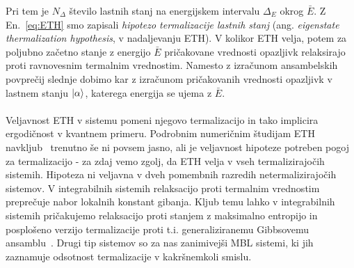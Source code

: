 Pri tem je $N_\Delta$ število lastnih stanj na energijskem intervalu $\Delta_E$ okrog $\bar{E}.$ Z En.~\eqref{eq:ETH} smo zapisali \emph{hipotezo termalizacije lastnih stanj} (ang. \emph{eigenstate thermalization hypothesis}, v nadaljevanju ETH). V kolikor ETH velja, potem za poljubno začetno stanje z energijo $\bar{E}$ pričakovane vrednosti opazljivk relaksirajo proti ravnovesnim termalnim vrednostim. Namesto z izračunom ansambelskih povprečij slednje dobimo kar z izračunom pričakovanih vrednosti opazljivk v lastnem stanju $\vert\alpha\rangle$, katerega energija se ujema z $\bar{E}.$\\\\
Veljavnost ETH v sistemu pomeni njegovo termalizacijo in tako implicira ergodičnost v kvantnem primeru. Podrobnim numeričnim študijam ETH navkljub~\cite{d2016quantum} trenutno še ni povsem jasno, ali je veljavnost hipoteze potreben pogoj za termalizacijo - za zdaj vemo zgolj, da ETH velja v vseh termalizirajočih sistemih. Hipoteza ni veljavna v dveh pomembnih razredih netermalizirajočih sistemov. V integrabilnih sistemih relaksacijo proti termalnim vrednostim preprečuje nabor lokalnih konstant  gibanja. Kljub temu lahko v integrabilnih sistemih pričakujemo relaksacijo proti stanjem z maksimalno entropijo in posplošeno verzijo termalizacije proti t.i. generaliziranemu Gibbsovemu ansamblu~\cite{rigol2008thermalization}. Drugi tip sistemov so za nas zanimivejši MBL sistemi, ki jih zaznamuje odsotnost termalizacije v kakršnemkoli smislu. 
